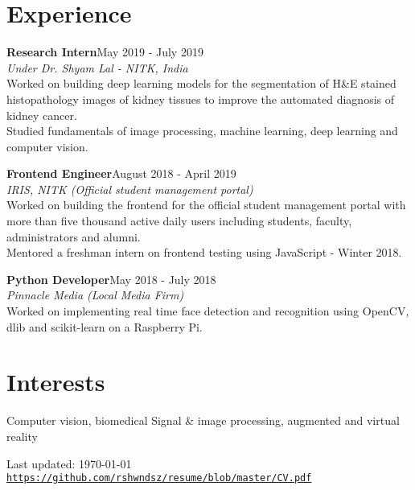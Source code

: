 \documentclass[letterpaper]{article}
\def\footerlink{https://github.com/rshwndsz/resume/blob/master/CV.pdf}
\renewenvironment{itemize}{
  \begin{list}{}{
    \setlength{\leftmargin}{1.5em}
  }
}{
  \end{list}
}
\begin{document}
\section*{Experience}
  \begin{itemize}
    \item \textbf{Research Intern}\hfill{May 2019 - July 2019}\\
    \textit{Under Dr. Shyam Lal - NITK, India}\\
    Worked on building deep learning models for the segmentation of H\&E stained histopathology images of kidney tissues to improve the automated diagnosis of kidney cancer.\\
    Studied fundamentals of image processing, machine learning, deep learning and computer vision.

    \item \textbf{Frontend Engineer}\hfill{August 2018 - April 2019}\\
    \textit{IRIS, NITK (Official student management portal)}\\
    Worked on building the frontend for the official student management portal with more than five thousand active daily users including students, faculty, administrators and alumni.\\
    Mentored a freshman intern on frontend testing using JavaScript - Winter 2018.

    \item \textbf{Python Developer}\hfill{May 2018 - July 2018}\\
    \textit{Pinnacle Media (Local Media Firm)}\\
    Worked on implementing real time face detection and recognition using OpenCV, dlib and scikit-learn on a Raspberry Pi.
  \end{itemize}

\section*{Interests}
  \begin{itemize}
    \item Computer vision, biomedical Signal \& image processing, augmented and virtual reality
  \end{itemize}

\bigskip

\begin{center}
  \begin{footnotesize}
    Last updated: \today \\
    \href{\footerlink}{\texttt{\footerlink}}
  \end{footnotesize}
\end{center}
\end{document}
